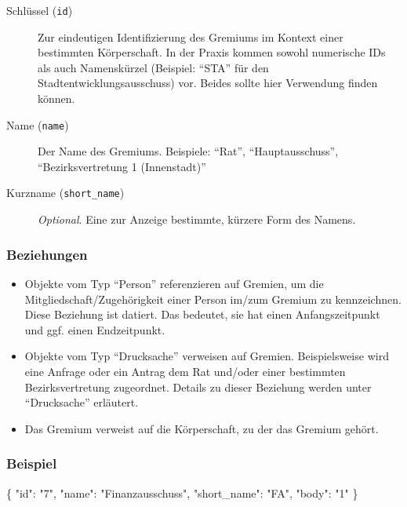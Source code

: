 \documentclass[,a4paper]{article}
\newenvironment{Shaded}{}{}
\newcommand{\DataTypeTok}[1]{\textcolor[rgb]{0.56,0.13,0.00}{{#1}}}
\newcommand{\StringTok}[1]{\textcolor[rgb]{0.25,0.44,0.63}{{#1}}}
\newcommand{\NormalTok}[1]{{#1}}
\begin{document}
\begin{description}
\item[Schlüssel (\texttt{id})]
Zur eindeutigen Identifizierung des Gremiums im Kontext einer bestimmten
Körperschaft. In der Praxis kommen sowohl numerische IDs als auch
Namenskürzel (Beispiel: ``STA'' für den Stadtentwicklungsausschuss) vor.
Beides sollte hier Verwendung finden können.
\item[Name (\texttt{name})]
Der Name des Gremiums. Beispiele: ``Rat'', ``Hauptausschuss'',
``Bezirksvertretung 1 (Innenstadt)''
\item[Kurzname (\texttt{short\_name})]
\emph{Optional}. Eine zur Anzeige bestimmte, kürzere Form des Namens.
\end{description}

\subsubsection{Beziehungen}

\begin{itemize}
\item
  Objekte vom Typ ``Person'' referenzieren auf Gremien, um die
  Mitgliedschaft/Zugehörigkeit einer Person im/zum Gremium zu
  kennzeichnen. Diese Beziehung ist datiert. Das bedeutet, sie hat einen
  Anfangszeitpunkt und ggf. einen Endzeitpunkt.
\item
  Objekte vom Typ ``Drucksache'' verweisen auf Gremien. Beispielsweise
  wird eine Anfrage oder ein Antrag dem Rat und/oder einer bestimmten
  Bezirksvertretung zugeordnet. Details zu dieser Beziehung werden unter
  ``Drucksache'' erläutert.
\item
  Das Gremium verweist auf die Körperschaft, zu der das Gremium gehört.
\end{itemize}

\subsubsection{Beispiel}

\begin{Shaded}
\begin{Highlighting}[]
\NormalTok{\{}
    \DataTypeTok{"id"}\NormalTok{: }\StringTok{"7"}\NormalTok{,}
    \DataTypeTok{"name"}\NormalTok{: }\StringTok{"Finanzausschuss"}\NormalTok{,}
    \DataTypeTok{"short_name"}\NormalTok{: }\StringTok{"FA"}\NormalTok{,}
    \DataTypeTok{"body"}\NormalTok{: }\StringTok{"1"}
\NormalTok{\}}
\end{Highlighting}
\end{Shaded}
\end{document}
